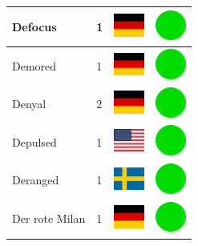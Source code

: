 \documentclass[12pt, a4paper, twoside]{report}
\begin{document}
\begin{center}
\begin{longtable}{|p{5cm}|p{2cm}|p{2cm}|p{2cm}|}
			Defocus & 1 & \includegraphics[width=1cm]{4x3/de} & \includegraphics[width=1cm]{likes/y} \\ \hline
			Demored & 1 & \includegraphics[width=1cm]{4x3/de} & \includegraphics[width=1cm]{likes/y} \\ \hline
			Denyal & 2 & \includegraphics[width=1cm]{4x3/de} & \includegraphics[width=1cm]{likes/y} \\ \hline
			Depulsed & 1 & \includegraphics[width=1cm]{4x3/us} & \includegraphics[width=1cm]{likes/y} \\ \hline
			Deranged & 1 & \includegraphics[width=1cm]{4x3/se} & \includegraphics[width=1cm]{likes/y} \\ \hline
			Der rote Milan & 1 & \includegraphics[width=1cm]{4x3/de} & \includegraphics[width=1cm]{likes/y} \\ \hline

\end{longtable}
\end{center}
\end{document}
